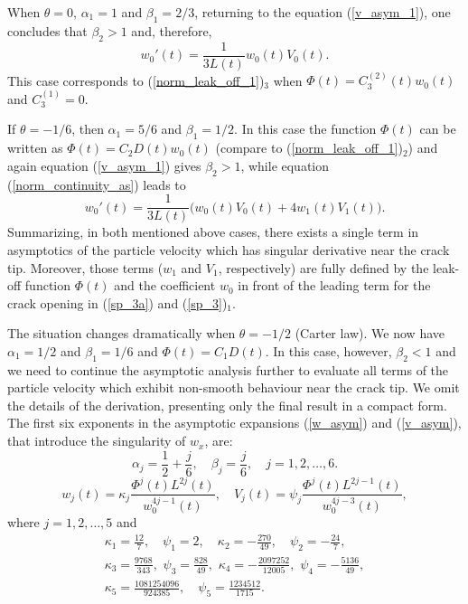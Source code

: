 When $\theta=0$, $\alpha_1=1$ and $\beta_1=2/3$, returning to the equation (\ref{v_asym_1}), one concludes that $\beta_2>1$ and, therefore,
\begin{equation}
w_{0}'(t)= \frac{1}{3L(t)} w_0(t)V_0(t).
\label{sp_4}
\end{equation}
This case corresponds to (\ref{norm_leak_off_1})$_3$ when $\Phi(t)=C_3^{(2)}(t)w_0(t)$ and $C_3^{(1)}=0$.


If $\theta=-1/6$, then $\alpha_1=5/6$ and $\beta_1=1/2$. In this case the function $\Phi(t)$ can be written as $\Phi(t)=C_2 D(t)w_0(t)$ (compare to (\ref{norm_leak_off_1})$_2$) 
and again equation (\ref{v_asym_1}) gives $\beta_2>1$, while equation (\ref{norm_continuity_as}) leads to
\begin{equation}
w_{0}'(t)= \frac{1}{3L(t)} \big(w_0(t)V_0(t)+4w_1(t)V_1(t)\big).
\label{sp_5}
\end{equation}
Summarizing, in both mentioned above cases, there exists a single term in asymptotics of the particle velocity which has singular derivative near the crack tip. Moreover, those terms ($w_1$ and $V_1$, respectively) are fully defined by the leak-off function $\Phi(t)$ and the coefficient $w_0$ in front of the leading term for the crack opening in (\ref{sp_3a}) and (\ref{sp_3})$_1$.

The situation changes dramatically when $\theta=-1/2$ (Carter law). We now have $\alpha_1=1/2$ and $\beta_1=1/6$ and $\Phi(t)=C_1D(t)$. In this case, however, $\beta_2<1$ and we need to continue the asymptotic analysis further to evaluate all terms of the particle velocity which exhibit non-smooth  behaviour near the crack tip. We omit the details of the derivation, presenting only the final result in a compact form.
The first six exponents in the asymptotic expansions (\ref{w_asym}) and (\ref{v_asym}), that introduce the singularity of $w_x$, are:
\[
\alpha_j=\frac{1}{2}+\frac{j}{6},\quad \beta_j=\frac{j}{6},\quad j=1,2,\ldots,6.
\]
\[
w_j(t)=\kappa_j\frac{\Phi^j(t)L^{2j}(t)}{w_0^{4j-1}(t)},\quad V_j(t)=\psi_j\frac{\Phi^j(t)L^{2j-1}(t)}{w_0^{4j-3}(t)},
\]
where $j=1,2,\ldots,5$ and
\[
\begin{array}{l}
\kappa_1=\frac{12}{7},\quad \psi_1=2,\quad \kappa_2=-\frac{270}{49},\quad \psi_2=-\frac{24}{7},
\\[4mm]
\kappa_3=\frac{9768}{343}, \,\, \psi_3=\frac{828}{49},\,\, \kappa_4=-\frac{2097252}{12005},\,\, \psi_4=-\frac{5136}{49},
\\[4mm]
\kappa_5=\frac{1081254096}{924385},\quad \psi_5=\frac{1234512}{1715}.
\end{array}
\]